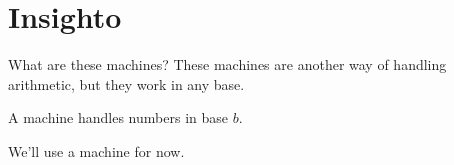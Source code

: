 \section{Insighto}
\begin{namedframe}{What are these machines?}
	These machines are another way of handling arithmetic, but they work in any base.

	A  machine handles numbers in base $b$.

	We'll use a  machine for now.
\end{namedframe}
